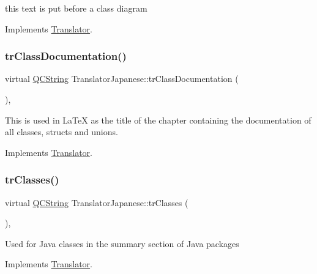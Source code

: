 this text is put before a class diagram 

Implements \mbox{\hyperlink{class_translator}{Translator}}.

\mbox{\label{class_translator_japanese_ae30321cdfb2130dcd973ce5b4bb3d42e}} 
\subsubsection{\texorpdfstring{trClassDocumentation()}{trClassDocumentation()}}
{\footnotesize\ttfamily virtual \mbox{\hyperlink{class_q_c_string}{Q\+C\+String}} Translator\+Japanese\+::tr\+Class\+Documentation (\begin{DoxyParamCaption}{ }\end{DoxyParamCaption})\hspace{0.3cm}{\ttfamily [inline]}, {\ttfamily [virtual]}}

This is used in La\+TeX as the title of the chapter containing the documentation of all classes, structs and unions. 

Implements \mbox{\hyperlink{class_translator}{Translator}}.

\mbox{\label{class_translator_japanese_ad84cb0b3598d4fbec1959b9e664c5714}} 
\subsubsection{\texorpdfstring{trClasses()}{trClasses()}}
{\footnotesize\ttfamily virtual \mbox{\hyperlink{class_q_c_string}{Q\+C\+String}} Translator\+Japanese\+::tr\+Classes (\begin{DoxyParamCaption}{ }\end{DoxyParamCaption})\hspace{0.3cm}{\ttfamily [inline]}, {\ttfamily [virtual]}}

Used for Java classes in the summary section of Java packages 

Implements \mbox{\hyperlink{class_translator}{Translator}}.

\mbox{\label{class_translator_japanese_ac7607e00fecebe825dcf39bffd221b77}} 
